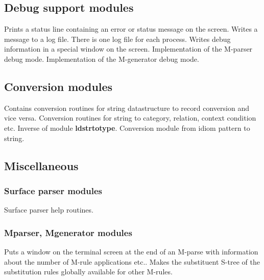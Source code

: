 \subsection{Debug support modules}

\bsc
{} Prints a status line containing an error or status message
             on the screen.
 Writes a message to a log file. There is one log file for each
           process.
 Writes debug information in a special window on the screen.
 Implementation of the M-parser debug mode.
 Implementation of the M-generator debug mode.
\esc

\subsection{Conversion modules}

\bsc
{} Contains conversion routines for string datastructure to
                   record conversion and vice versa.
 Conversion routines for string to category, relation,
                     context condition etc.
 Inverse of module {\bf ldstrtotype}.
 Conversion module from idiom pattern to string.
\esc

\subsection{Miscellaneous}

\subsubsection{Surface parser modules}

\bsc
{} Surface parser help routines.
\esc

\subsubsection{Mparser, Mgenerator modules}

\bsc
{} Puts a window on the
                           terminal screen at the end of an M-parse
                           with information about the number
                           of M-rule applications etc..
 Makes the substituent S-tree of the substitution rules
                        globally available for other M-rules.
\esc

